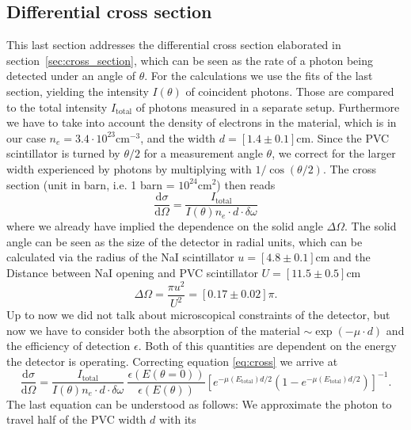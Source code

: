 \subsection{Differential cross section}
\label{sub:cross_section}
This last section addresses the differential cross section elaborated in section~\ref{sec:cross_section}, which can
be seen as the rate of a photon being detected under an angle of $\theta$. 
For the calculations
we use the fits of the last section, yielding the intensity $I(\theta)$ of coincident photons. Those are compared to the total
intensity $I_\mathrm{total}$ of photons measured in a separate setup. Furthermore we have to take into account the density of
electrons in the material, which is in our case $n_e= 3.4\cdot10^{23}\mathrm{cm}^{-3}$, and the width $d = [1.4 \pm 0.1]$cm. 
Since the PVC scintillator is turned by $\theta / 2$ for a measurement angle $\theta$, we correct for the larger width experienced 
by photons by multiplying with $1 / \cos(\theta / 2)$. 
The cross section (unit in barn, i.e. 1 barn = $10^{24}\mathrm{cm}^{2}$) then reads
\begin{equation}
    \label{eq:cross}
    \frac{\mathrm{d}\sigma}{\mathrm{d} \Omega} = \frac{I_\mathrm{total}}{I(\theta) n_e \cdot d \cdot \delta \omega}
\end{equation}
where we already have implied the dependence on the solid angle $\Delta \Omega$. The solid angle can be seen as the size of the
detector in radial units, which can be calculated via the radius of the NaI scintillator $u=[4.8\pm0.1]$cm and the Distance
between NaI opening and PVC scintillator $U=[11.5\pm0.5]$cm
\begin{equation}
    \Delta \Omega = \frac{\pi u^2}{U^2}  = [0.17 \pm 0.02] \pi.
\end{equation}
Up to now we did not talk about microscopical constraints of the detector, but now we have to consider both the absorption
of the material $\sim \exp(-\mu \cdot d)$ and the efficiency of detection $\epsilon$. Both of this quantities are dependent on the
energy the detector is operating. Correcting equation \eqref{eq:cross} we arrive at
\begin{equation}
\label{eq:diff_cross}
    \frac{\mathrm{d} \sigma}{\mathrm{d} \Omega} = \frac{I_\mathrm{total}}{I(\theta) n_e \cdot d \cdot \delta \omega} \
    \frac{\epsilon(E(\theta = 0 ))}{\epsilon(E(\theta))} \left[ e^{-\mu(E_{\mathrm{total} }) d/2}
    \left( 1 - e^{-\mu(E_{\mathrm{total} }) d/2}  \right)\right]^{-1}.
\end{equation}
The last equation can be understood as follows: We approximate the photon to travel half of the PVC width $d$ with its
